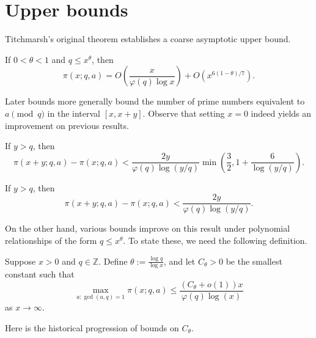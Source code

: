 \section{Upper bounds}
Titchmarsh's original theorem establishes a coarse asymptotic upper bound.

\begin{theorem}
If $0<\theta<1$ and $q\leq x^\theta$, then
$$\pi(x;q,a)=O\left(\frac x{\varphi(q)\log x}\right)+O(x^{6(1-\theta)/7}).$$
\end{theorem}

Later bounds more generally bound the number of prime numbers equivalent to $a\pmod q$ in the interval $[x,x+y]$. Observe that setting $x=0$ indeed yields an improvement on previous results.

\begin{theorem}
If $y>q$, then
$$\pi(x+y;q,a)-\pi(x;q,a)<\frac{2y}{\varphi(q)\log(y/q)}\min\left(\frac32,1+\frac6{\log(y/q)}\right).$$
\end{theorem}

\begin{theorem}
If $y>q$, then
$$\pi(x+y;q,a)-\pi(x;q,a)<\frac{2y}{\varphi(q)\log(y/q)}.$$
\end{theorem}

On the other hand, various bounds improve on this result under polynomial relationships of the form $q\leq x^\theta$. To state these, we need the following definition.
\begin{definition}
Suppose $x>0$ and $q\in\mathbb Z$. Define $\theta:=\frac{\log q}{\log x}$, and let $C_\theta>0$ be the smallest constant such that
$$\max_{a:\gcd(a,q)=1}\pi(x;q,a)\leq\frac{(C_\theta+o(1))x}{\varphi(q)\log(x)}$$
as $x\to\infty$.
\end{definition}

Here is the historical progression of bounds on $C_\theta$.


